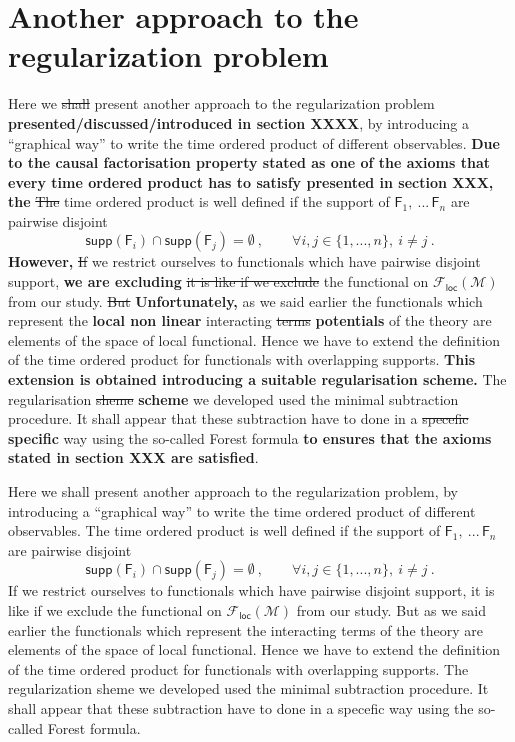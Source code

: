 \documentclass[11pt]{book}
\newcommand{\com}[1]{{\color{red}\bf #1}}
\newcommand{\sbar}[1]{\sout{\color{red} #1}}
\newcommand{\supp}{\mathsf{supp}}
\newcommand{\Fcal}{\mathcal{F}}
\newcommand{\Mcal}{\mathcal{M}}
\newcommand{\Fsf}{\mathsf{F}}
\theoremstyle{break}
\begin{document}
\section{Another approach to the regularization problem}
\label{p:ANOTHER_APPROACH}


Here we \sbar{shall} present another approach to the regularization problem \com{presented/discussed/introduced in section XXXX}, by introducing a ``graphical way'' to write the time ordered product of different observables. 
\com{Due to the causal factorisation property stated as one of the axioms that every time ordered product has to satisfy presented in section XXX, the}
\sbar{The} time ordered product is well defined if the support of $\Fsf_1, \ ... \, \Fsf_n$ are pairwise disjoint
%
\begin{equation*}
\supp(\Fsf_i) \cap \supp(\Fsf_j) = \emptyset \ , \qquad \forall i , j \in \{1,...,n\}, \ i \neq j \ . 
\end{equation*}
%
\com{However, }\sbar{If} we restrict ourselves to functionals which have pairwise disjoint support, \com{we are excluding} \sbar{it is like if we exclude} the functional on $\Fcal_\mathsf{loc}(\Mcal)$ from our study. \sbar{But} \com{Unfortunately, } as we said earlier the functionals which represent the \com{local non linear} interacting \sbar{terms} \com{potentials} of the theory are elements of the space of local functional. Hence we have to extend the definition of the time ordered product for functionals with overlapping supports. \com{This extension is obtained introducing a suitable regularisation scheme.} The regularisation \sbar{sheme} \com{scheme} we developed used the minimal subtraction procedure. It shall appear that these subtraction have to done in a \sbar{specefic} \com{specific} way using the so-called Forest formula \com{to ensures that the axioms stated in section XXX are satisfied}.


\bigskip

Here we shall present another approach to the regularization problem, by introducing a ``graphical way'' to write the time ordered product of different observables. The time ordered product is well defined if the support of $\Fsf_1, \ ... \, \Fsf_n$ are pairwise disjoint
%
\begin{equation*}
\supp(\Fsf_i) \cap \supp(\Fsf_j) = \emptyset \ , \qquad \forall i , j \in \{1,...,n\}, \ i \neq j \ . 
\end{equation*}
%
If we restrict ourselves to functionals which have pairwise disjoint support, it is like if we exclude the functional on $\Fcal_\mathsf{loc}(\Mcal)$ from our study. But as we said earlier the functionals which represent the interacting terms of the theory are elements of the space of local functional. Hence we have to extend the definition of the time ordered product for functionals with overlapping supports. The regularization sheme we developed used the minimal subtraction procedure. It shall appear that these subtraction have to done in a specefic way using the so-called Forest formula.
\end{document}
